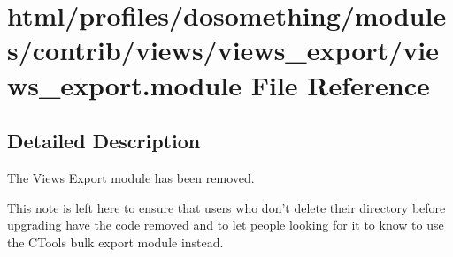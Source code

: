 \hypertarget{views__export_8module}{
\section{html/profiles/dosomething/modules/contrib/views/views\_\-export/views\_\-export.module File Reference}
\label{views__export_8module}
}


\subsection{Detailed Description}
The Views Export module has been removed.

This note is left here to ensure that users who don't delete their directory before upgrading have the code removed and to let people looking for it to know to use the CTools bulk export module instead. 